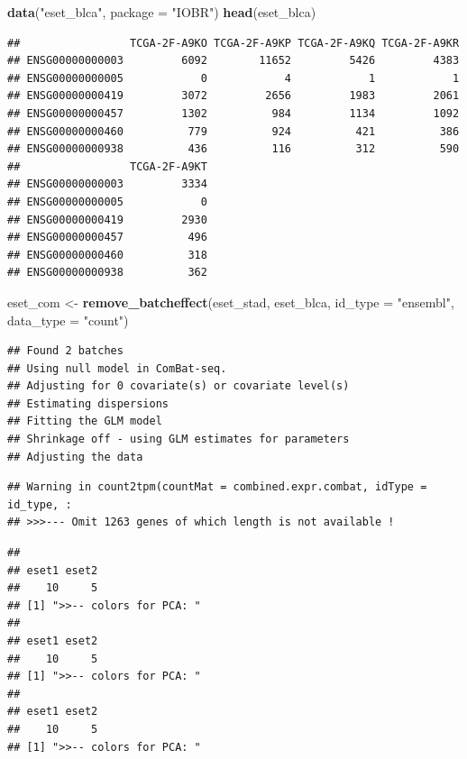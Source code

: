 \documentclass[
  12pt,
]{book}
\newenvironment{Shaded}{\begin{snugshade}}{\end{snugshade}}
\newcommand{\AttributeTok}[1]{\textcolor[rgb]{0.13,0.29,0.53}{#1}}
\newcommand{\FunctionTok}[1]{\textcolor[rgb]{0.13,0.29,0.53}{\textbf{#1}}}
\newcommand{\NormalTok}[1]{#1}
\newcommand{\OtherTok}[1]{\textcolor[rgb]{0.56,0.35,0.01}{#1}}
\newcommand{\StringTok}[1]{\textcolor[rgb]{0.31,0.60,0.02}{#1}}
\begin{document}
\begin{Shaded}
\begin{Highlighting}[]
\FunctionTok{data}\NormalTok{(}\StringTok{"eset\_blca"}\NormalTok{, }\AttributeTok{package =} \StringTok{"IOBR"}\NormalTok{)}
\FunctionTok{head}\NormalTok{(eset\_blca)}
\end{Highlighting}
\end{Shaded}

\begin{verbatim}
##                 TCGA-2F-A9KO TCGA-2F-A9KP TCGA-2F-A9KQ TCGA-2F-A9KR
## ENSG00000000003         6092        11652         5426         4383
## ENSG00000000005            0            4            1            1
## ENSG00000000419         3072         2656         1983         2061
## ENSG00000000457         1302          984         1134         1092
## ENSG00000000460          779          924          421          386
## ENSG00000000938          436          116          312          590
##                 TCGA-2F-A9KT
## ENSG00000000003         3334
## ENSG00000000005            0
## ENSG00000000419         2930
## ENSG00000000457          496
## ENSG00000000460          318
## ENSG00000000938          362
\end{verbatim}

\begin{Shaded}
\begin{Highlighting}[]
\NormalTok{eset\_com }\OtherTok{\textless{}{-}} \FunctionTok{remove\_batcheffect}\NormalTok{(eset\_stad, eset\_blca, }\AttributeTok{id\_type =} \StringTok{"ensembl"}\NormalTok{, }\AttributeTok{data\_type =} \StringTok{"count"}\NormalTok{)}
\end{Highlighting}
\end{Shaded}

\begin{verbatim}
## Found 2 batches
## Using null model in ComBat-seq.
## Adjusting for 0 covariate(s) or covariate level(s)
## Estimating dispersions
## Fitting the GLM model
## Shrinkage off - using GLM estimates for parameters
## Adjusting the data
\end{verbatim}

\begin{verbatim}
## Warning in count2tpm(countMat = combined.expr.combat, idType = id_type, :
## >>>--- Omit 1263 genes of which length is not available !
\end{verbatim}

\begin{verbatim}
## 
## eset1 eset2 
##    10     5 
## [1] ">>-- colors for PCA: "
## 
## eset1 eset2 
##    10     5 
## [1] ">>-- colors for PCA: "
## 
## eset1 eset2 
##    10     5 
## [1] ">>-- colors for PCA: "
\end{verbatim}
\end{document}
